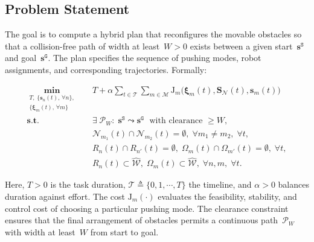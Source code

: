 \subsection{Problem Statement}\label{subsec:objective}

The goal is to compute a hybrid plan that reconfigures the movable obstacles
so that a collision-free path of width at least~$W>0$ exists between a given
start~$\mathbf{s}^{\texttt{S}}$ and goal~$\mathbf{s}^{\texttt{G}}$.
The plan specifies the sequence of pushing modes, robot assignments, and
corresponding trajectories. Formally:

\vspace{-0.05in}
\begin{equation}\label{eq:problem}
\begin{split}
\underset{\substack{T,\;\{\mathbf{s}_n(t),\,\forall n\},\\
      \{\boldsymbol{\xi}_m(t),\,\forall m\}}}{\textbf{min}} \quad &
  T + \alpha \sum_{t\in\mathcal{T}}
  \sum_{m\in\mathcal{M}}
  \mathrm{J}_m\big(\boldsymbol{\xi}_m(t),\mathbf{S}_{\mathcal{N}}(t),\mathbf{s}_m(t)\big) \\
\textbf{s.t.}\quad &
\exists\;\mathcal{P}_W:\;\mathbf{s}^{\texttt{S}}\leadsto\mathbf{s}^{\texttt{G}}
\;\text{ with clearance }\geq W, \\
& \mathcal{N}_{m_1}(t)\cap\mathcal{N}_{m_2}(t)=\emptyset,\;\forall m_1\neq m_2,\;\forall t,\\
& R_n(t)\cap R_{n'}(t)=\emptyset,\;\Omega_m(t)\cap\Omega_{m'}(t)=\emptyset,\;\forall t,\\
& R_n(t)\subset\widehat{\mathcal{W}},\;\Omega_m(t)\subset\widehat{\mathcal{W}},\;\forall n,m,\;\forall t.
\end{split}
\end{equation}

Here, $T>0$ is the task duration, $\mathcal{T}\triangleq\{0,1,\cdots,T\}$ the
timeline, and $\alpha>0$ balances duration against effort. The cost
$\mathrm{J}_m(\cdot)$ evaluates the feasibility, stability, and control cost of
choosing a particular pushing mode. The clearance constraint ensures that the
final arrangement of obstacles permits a continuous path~$\mathcal{P}_W$ with
width at least~$W$ from start to goal.
